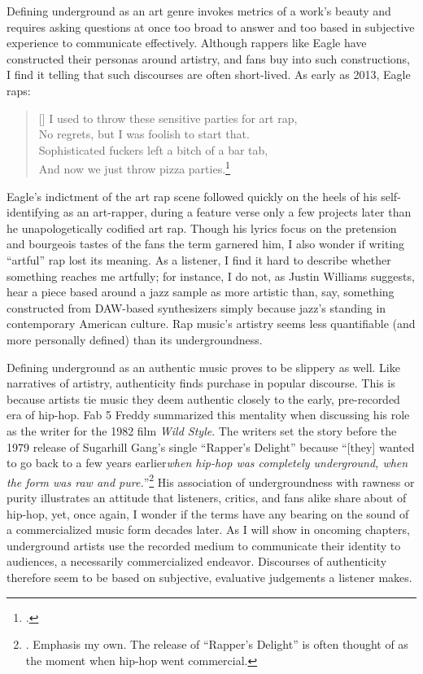 Defining underground as an art genre invokes metrics of a work's beauty and requires asking
questions at once too broad to answer and too based in subjective experience to communicate
effectively. Although rappers like Eagle have constructed their personas around artistry, and 
fans buy into such constructions, I find it telling that such discourses are often short-lived.
As early as 2013, Eagle raps:
\settowidth{\versewidth}{I used to throw these sensitive parties for art rap,}
    \begin{verse}[\versewidth]
        \small I used to throw these sensitive parties for art rap, \\
        \small No regrets, but I was foolish to start that. \\
        \small Sophisticated fuckers left a bitch of a bar tab, \\
        \small And now we just throw pizza parties.\footnote{
        \cite{milo2013}.}
    \end{verse}
Eagle's indictment of the art rap scene followed quickly on the heels of his self-identifying
as an art-rapper, during a feature verse only a few projects later than he unapologetically
codified art rap. Though his lyrics focus on the pretension and bourgeois tastes of the fans
the term garnered him, I also  wonder if writing ``artful'' rap lost its meaning. As a listener,
I find it hard to describe whether something reaches me artfully; for instance, I do not, as
Justin Williams suggests, hear a piece based around a jazz sample as more artistic than, say,
something constructed from DAW-based synthesizers simply because jazz's standing in contemporary
American culture. Rap music's artistry seems less quantifiable (and more personally defined) 
than its undergroundness.

Defining underground as an authentic music proves to be slippery as well. Like narratives of artistry, authenticity
finds purchase in popular discourse. This is  because artists tie music they deem authentic closely to the early,
pre-recorded era of hip-hop. Fab 5 Freddy summarized this mentality when discussing  his role as the writer for 
the 1982 film \textit{Wild Style}. The writers set the story before the 1979 release of Sugarhill Gang's single
``Rapper's Delight'' because ``[they] wanted to go back to a few years earlier\textellipsis \emph{when hip-hop was 
completely underground, when the form was raw and pure.}''\footnote{
    \autocite[23]{justinawilliamsRhyminStealinMusical2013}. Emphasis my own. The release
    of ``Rapper's Delight'' is often thought of as the moment when hip-hop went commercial.}
His association of undergroundness with rawness or purity illustrates an attitude that listeners, critics, and fans
alike share about of hip-hop, yet, once again, I wonder if the terms have any bearing on the sound of a commercialized
music form decades later. As I will show in oncoming chapters, underground artists use the recorded medium to communicate
their identity to audiences, a necessarily commercialized endeavor. Discourses of authenticity therefore seem to be based
on subjective, evaluative judgements a listener makes.


